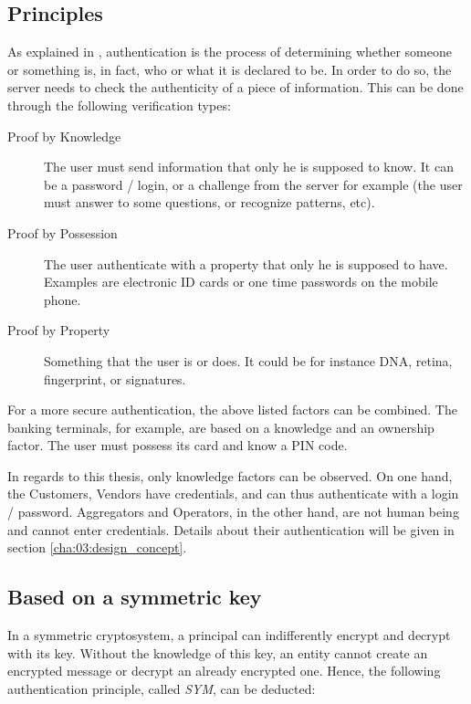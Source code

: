 \subsection{Principles}
As explained in \cite{patel2008information}, authentication is the process of determining whether someone or something is, in fact, who or what it is declared to be.	In order to do so, the server needs to check the authenticity of a piece of information. This can be done through the following verification types:

\begin{description}
	\item[Proof by Knowledge] The user must send information that only he is supposed to know. It can be a password / login, or a challenge from the server for example (the user must answer to some questions, or recognize patterns, etc).
	\item[Proof by Possession] The user authenticate with a property that only he is supposed to have. Examples are electronic ID cards or one time passwords on the mobile phone.
	\item[Proof by Property] Something that the user is or does. It could be for instance DNA, retina, fingerprint, or signatures. 
\end{description}

For a more secure authentication, the above listed factors can be combined. The banking terminals, for example, are based on a knowledge and an ownership factor. The user must possess its card and know a PIN code.

In regards to this thesis, only knowledge factors can be observed. On one hand, the Customers, Vendors have credentials, and can thus authenticate with a login / password. Aggregators and Operators, in the other hand, are not human being and cannot enter credentials. Details about their authentication will be given in section \ref{cha:03:design_concept}.


\subsection{Based on a symmetric key}
In a symmetric cryptosystem, a principal can indifferently encrypt and decrypt with its key. Without the knowledge of this key, an entity cannot create an encrypted message or decrypt an already encrypted one. Hence, the following authentication principle, called \emph{SYM}, can be deducted\cite{Woo1997}:

